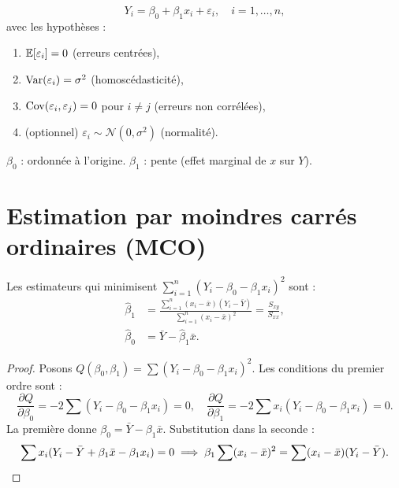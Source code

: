 \begin{definition}
\[
Y_i = \beta_0 + \beta_1 x_i + \varepsilon_i, \quad i=1,\ldots,n,
\]
avec les hypoth\`eses :
\begin{enumerate}
\item $\mathbb{E}[\varepsilon_i]=0$ (erreurs centr\'ees),
\item $\operatorname{Var}(\varepsilon_i)=\sigma^2$ (homoscédasticité),
\item $\operatorname{Cov}(\varepsilon_i,\varepsilon_j)=0$ pour $i\neq j$ (erreurs non corr\'el\'ees),
\item (optionnel) $\varepsilon_i\sim\mathcal{N}(0,\sigma^2)$ (normalit\'e).
\end{enumerate}
$\beta_0$ : ordonn\'ee \`a l'origine. $\beta_1$ : pente (effet marginal de $x$ sur $Y$).
\end{definition}

\section{Estimation par moindres carr\'es ordinaires (MCO)}

\begin{theoreme}
Les estimateurs qui minimisent $\sum_{i=1}^n (Y_i-\beta_0-\beta_1 x_i)^2$ sont :
\begin{align}
\hat{\beta}_1 &= \frac{\sum_{i=1}^n(x_i-\bar{x})(Y_i-\bar{Y})}{\sum_{i=1}^n(x_i-\bar{x})^2} = \frac{S_{xy}}{S_{xx}}, \label{eq:beta1}\\
\hat{\beta}_0 &= \bar{Y}-\hat{\beta}_1\bar{x}. \label{eq:beta0}
\end{align}
\end{theoreme}

\begin{proof}
Posons $Q(\beta_0,\beta_1)=\sum(Y_i-\beta_0-\beta_1 x_i)^2$. Les conditions du premier ordre sont :
\[
\frac{\partial Q}{\partial\beta_0}=-2\sum(Y_i-\beta_0-\beta_1 x_i)=0, \quad
\frac{\partial Q}{\partial\beta_1}=-2\sum x_i(Y_i-\beta_0-\beta_1 x_i)=0.
\]
La premi\`ere donne $\beta_0=\bar{Y}-\beta_1\bar{x}$. Substitution dans la seconde :
\[
\sum x_i(Y_i-\bar{Y}+\beta_1\bar{x}-\beta_1 x_i)=0 \implies \beta_1\sum(x_i-\bar{x})^2=\sum(x_i-\bar{x})(Y_i-\bar{Y}). \qedhere
\]
\end{proof}

